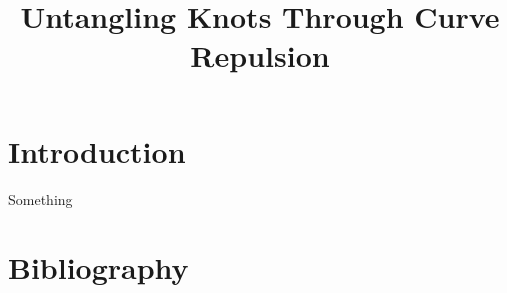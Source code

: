 \documentclass[a4paper]{article}
\title{Untangling Knots Through Curve Repulsion}
\begin{document}

\section{Introduction}


Something \cite{YSC2021}

\section{Bibliography}
\printbibliography
\end{document}
